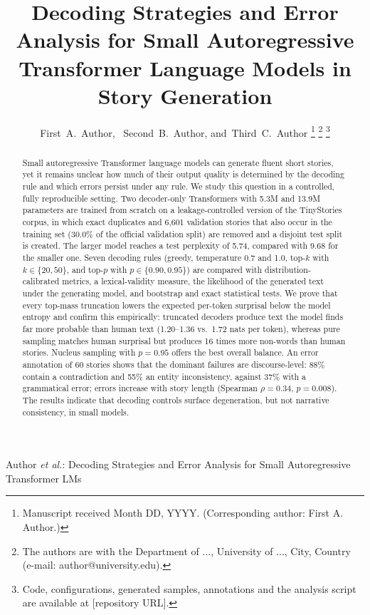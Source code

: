 \documentclass[journal]{IEEEtran}
\begin{document}
\title{Decoding Strategies and Error Analysis for Small Autoregressive Transformer Language Models in Story Generation}

\author{First~A.~Author,~
        Second~B.~Author,
        and~Third~C.~Author%
\thanks{Manuscript received Month DD, YYYY. (Corresponding author: First A. Author.)}%
\thanks{The authors are with the Department of ..., University of ..., City, Country (e-mail: author@university.edu).}%
\thanks{Code, configurations, generated samples, annotations and the analysis script are available at [repository URL].}}

%
{Author \MakeLowercase{\textit{et al.}}: Decoding Strategies and Error Analysis for Small Autoregressive Transformer LMs}

\maketitle

\begin{abstract}
Small autoregressive Transformer language models can generate fluent short stories, yet it remains unclear how much of their output quality is determined by the decoding rule and which errors persist under any rule. We study this question in a controlled, fully reproducible setting. Two decoder-only Transformers with 5.3M and 13.9M parameters are trained from scratch on a leakage-controlled version of the TinyStories corpus, in which exact duplicates and 6,601 validation stories that also occur in the training set (30.0\% of the official validation split) are removed and a disjoint test split is created. The larger model reaches a test perplexity of 5.74, compared with 9.68 for the smaller one. Seven decoding rules (greedy, temperature 0.7 and 1.0, top-$k$ with $k\in\{20,50\}$, and top-$p$ with $p\in\{0.90,0.95\}$) are compared with distribution-calibrated metrics, a lexical-validity measure, the likelihood of the generated text under the generating model, and bootstrap and exact statistical tests. We prove that every top-mass truncation lowers the expected per-token surprisal below the model entropy and confirm this empirically: truncated decoders produce text the model finds far more probable than human text (1.20--1.36 vs.\ 1.72 nats per token), whereas pure sampling matches human surprisal but produces 16 times more non-words than human stories. Nucleus sampling with $p=0.95$ offers the best overall balance. An error annotation of 60 stories shows that the dominant failures are discourse-level: 88\% contain a contradiction and 55\% an entity inconsistency, against 37\% with a grammatical error; errors increase with story length (Spearman $\rho=0.34$, $p=0.008$). The results indicate that decoding controls surface degeneration, but not narrative consistency, in small models.
\end{abstract}
\end{document}
